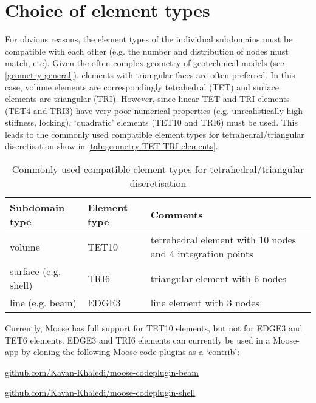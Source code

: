 \section{Choice of element types}
\label{geometry-element-types}

For obvious reasons, the element types of the individual subdomains must be
compatible with each other (e.g. the number and distribution of nodes must
match, etc). Given the often complex geometry of geotechnical models (see
\autoref{geometry-general}), elements with triangular faces are often
preferred. In this case, volume elements are correspondingly tetrahedral (TET)
and surface elements are triangular (TRI). However, since linear TET and TRI
elements (TET4 and TRI3) have very poor numerical properties (e.g.
unrealistically high stiffness, locking), ‘quadratic’ elements (TET10 and TRI6)
must be used. This leads to the commonly used compatible element types for
tetrahedral/triangular discretisation show in
\autoref{tab:geometry-TET-TRI-elements}.

\begin{table}
    \begin{tabularx}{\textwidth}{@{}lXl@{}}
        \hline
        Subdomain type
                             &
        Element type
                             &
        Comments
        \\

        \hline
        volume
                             &
        TET10
                             &
        tetrahedral element with 10 nodes and 4 integration points
        \\

        surface (e.g. shell) & TRI6  & triangular element with 6 nodes \\

        line (e.g. beam)     & EDGE3 & line element with 3 nodes       \\

        \hline
    \end{tabularx}
    \caption{Commonly used compatible element types for tetrahedral/triangular discretisation}
    \label{tab:geometry-TET-TRI-elements}
\end{table}

Currently, Moose has full support for TET10 elements, but not for EDGE3 and
TET6 elements. EDGE3 and TRI6 elements can currently be used in a Moose-app by
cloning the following Moose code-plugins as a ‘contrib’:

\begin{description}[font=$\bullet$~\normalfont]
    \item [beams:] \href{https://github.com/Kavan-Khaledi/moose-codeplugin-beam}{github.com/Kavan-Khaledi/moose-codeplugin-beam}
    \item [shells:] \href{https://github.com/Kavan-Khaledi/moose-codeplugin-shell}{github.com/Kavan-Khaledi/moose-codeplugin-shell}
\end{description}

